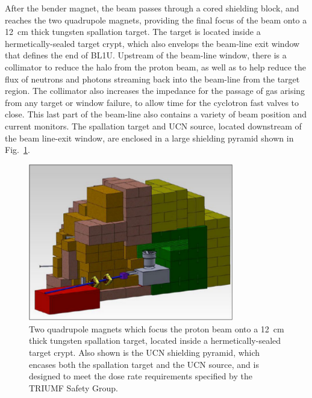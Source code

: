 After the bender magnet, the beam passes through a cored shielding
block, and reaches the two quadrupole magnets, providing the final
focus of the beam onto a 12~cm thick tungsten spallation target.  The
target is located inside a hermetically-sealed target crypt, which
also envelops the beam-line exit window that defines the end of BL1U.
Upstream of the beam-line window, there is a collimator to reduce the
halo from the proton beam, as well as to help reduce the flux of
neutrons and photons streaming back into the beam-line from the target
region. The collimator also increases the impedance for the passage of
gas arising from any target or window failure, to allow time for the
cyclotron fast valves to close. This last part of the beam-line also
contains a variety of beam position and current monitors. The
spallation target and UCN source, located downstream of the beam
line-exit window, are enclosed in a large shielding pyramid shown in
Fig.~\ref{fig:pyramid}.
\begin{figure}[h!]
  \centering
  \includegraphics[width=0.8\textwidth]{pyramid.png}
  \caption[Two quadrupole magnets and the shielding pyramid]{Two
    quadrupole magnets which focus the proton beam onto a 12~cm thick
    tungsten spallation target, located inside a hermetically-sealed
    target crypt. Also shown is the UCN shielding pyramid, which
    encases both the spallation target and the UCN source, and is
    designed to meet the dose rate requirements specified by the
    TRIUMF Safety Group.}
  \label{fig:pyramid}
\end{figure}


